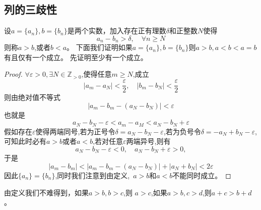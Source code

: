 \documentclass[12pt, a4paper, oneside]{ctexart}
\newcommand{\ep}{\varepsilon}
\newcommand{\cau}{\text{Cauchy}}
\newcommand{\an}{\{a_{n}\}}
\newcommand{\bn}{\{b_{n}\}}
\begin{document}
\subsection{\cau 列的三歧性}
设$a=\an,b=\bn$是两个实数，加入存在正有理数$\delta$和正整数$N$使得
\begin{equation*}
    a_{n}-b_{n}>\delta,  \quad \forall n\ge N
\end{equation*}
则称$a>b$,或者$b<a$。
下面我们证明如果$a=\an,b=\bn$则$a>b,a<b<a=b$有且仅有一个成立。
先证明至少有一个成立。
\begin{proof}
    $\forall \ep >0, \exists N\in \mathbb{Z}_{>0}$,使得任意$m\ge N$,成立
    \begin{equation*}
        |a_{m}-a_{N}|<\frac{\ep}{2},\quad |b_{m}-b_{N}|<\frac{\ep}{2}
    \end{equation*}
    则由绝对值不等式
    \begin{equation*}
        |a_{m}-b_{m}-(a_{N}-b_{N})|<\ep
    \end{equation*}
    也就是
    \begin{equation*}
        a_{N}-b_{N}-\ep<a_{m}-a_{M}< a_{N}-b_{N}+\ep
    \end{equation*}
    假如存在$\ep$使得两端同号,若为正号令$\delta=a_{N}-b_{N}-\ep$,若为负号令$\delta=-a_{N}+b_{N}-\ep$,
    可知此时必有$a>b或者a<b$,若对任意$\ep$两端异号,则有
    \begin{equation*}
        a_{N}-b_{N}-\ep<0,\quad a_{N}-b_{N}+\ep>0,
    \end{equation*}
    于是
    \begin{equation*}
        |a_{m}-b_{m}|<|a_{m}-b_{m}-(a_{N}-b_{N})|+|a_{N}+b_{N}|<2\ep
    \end{equation*}
    因此$\an=\bn$,同时我们注意到由定义,\, $a>b$和$a<b$不能同时成立。
\end{proof}
由定义我们不难得到，如果$a>b,b>c$,则 $a>c$,如果$a>b,c>d$,则$a+c>b+d$。
\end{document}
